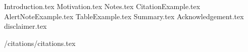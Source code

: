 \documentclass[aspectratio=\BeamerAspectRatio, t]{beamer}
\begin{document}
\maketitlepage %
\maketableofcontents %
\makesectionpopup %

{Introduction.tex}
{Motivation.tex}
{Notes.tex}
{CitationExample.tex}
{AlertNoteExample.tex}
{TableExample.tex}
{Summary.tex}
{Acknowledgement.tex}
{disclaimer.tex}

{/citations/citations.tex}
\end{document}
